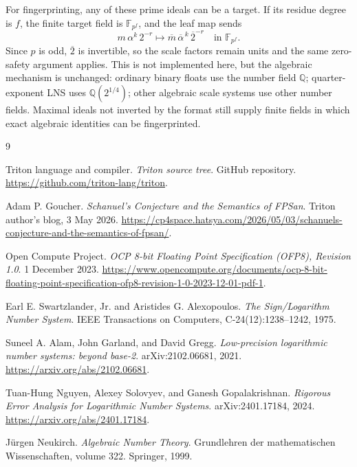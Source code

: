 \documentclass[11pt]{article}
\newcommand{\F}{\mathbb{F}}
\newcommand{\Q}{\mathbb{Q}}
\theoremstyle{plain}
\begin{document}
For fingerprinting, any of these prime ideals can be a target.  If its residue
degree is \(f\), the finite target field is \(\F_{p^f}\), and the leaf map sends
\[
  m\,\alpha^k\,2^{-r}
  \longmapsto
  \overline m\,\overline\alpha^{\,k}\,\overline 2^{-r}
  \quad\text{in }\F_{p^f}.
\]
Since \(p\) is odd, \(\overline2\) is invertible, so the scale factors remain
units and the same zero-safety argument applies.  This is not implemented here,
but the algebraic mechanism is unchanged: ordinary binary floats use the number
field \(\Q\); quarter-exponent LNS uses \(\Q(2^{1/4})\); other algebraic scale
systems use other number fields.  Maximal ideals not inverted by the format
still supply finite fields in which exact algebraic identities can be
fingerprinted.

\begin{thebibliography}{9}

Triton language and compiler.
\emph{Triton source tree}.
GitHub repository.
\url{https://github.com/triton-lang/triton}.

Adam P. Goucher.
\emph{Schanuel's Conjecture and the Semantics of FPSan}.
Triton author's blog, 3 May 2026.
\url{https://cp4space.hatsya.com/2026/05/03/schanuels-conjecture-and-the-semantics-of-fpsan/}.

Open Compute Project.
\emph{OCP 8-bit Floating Point Specification (OFP8), Revision 1.0}.
1 December 2023.
\url{https://www.opencompute.org/documents/ocp-8-bit-floating-point-specification-ofp8-revision-1-0-2023-12-01-pdf-1}.

Earl E. Swartzlander, Jr. and Aristides G. Alexopoulos.
\emph{The Sign/Logarithm Number System}.
IEEE Transactions on Computers, C-24(12):1238--1242, 1975.

Suneel A. Alam, John Garland, and David Gregg.
\emph{Low-precision logarithmic number systems: beyond base-2}.
arXiv:2102.06681, 2021.
\url{https://arxiv.org/abs/2102.06681}.

Tuan-Hung Nguyen, Alexey Solovyev, and Ganesh Gopalakrishnan.
\emph{Rigorous Error Analysis for Logarithmic Number Systems}.
arXiv:2401.17184, 2024.
\url{https://arxiv.org/abs/2401.17184}.

Jürgen Neukirch.
\emph{Algebraic Number Theory}.
Grundlehren der mathematischen Wissenschaften, volume 322.
Springer, 1999.

\end{thebibliography}
\end{document}
